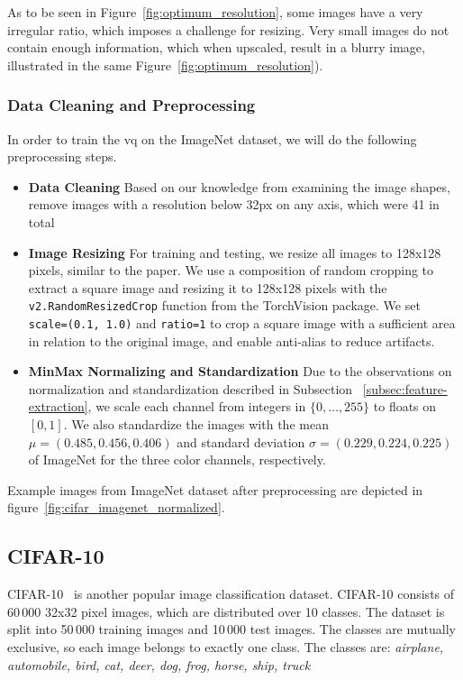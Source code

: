 As to be seen in Figure~\ref{fig:optimum_resolution}, some images have a very irregular ratio, which imposes a challenge
for resizing.
Very small images do not contain enough information, which when upscaled, result in a blurry image, illustrated in
the same Figure~\ref{fig:optimum_resolution}).

\subsubsection{Data Cleaning and Preprocessing}
In order to train the \ac{vq} on the ImageNet dataset, we will do the following preprocessing steps.

\begin{itemize}
    \item \textbf{Data Cleaning}
    Based on our knowledge from examining the image shapes, remove images with a resolution below 32px on any axis,
    which were 41 in total
    \item \textbf{Image Resizing}
    For training and testing, we resize all images to 128x128 pixels, similar to the paper.
    We use a composition of random cropping to extract a square image and resizing it to 128x128 pixels with
    the \texttt{v2.RandomResizedCrop} function from the TorchVision package.
    We set \texttt{scale=(0.1, 1.0)} and \texttt{ratio=1} to crop a square image with a sufficient area in
    relation to the original image, and enable anti-alias to reduce artifacts.
    \item \textbf{MinMax Normalizing and Standardization}
    Due to the observations on normalization and standardization described in Subsection
    ~\ref{subsec:feature-extraction}, we scale each channel from integers in $\{0,\dots,255\}$ to floats on
    $[0,1]$.
    We also standardize the images with the mean $\mu = (0.485, 0.456, 0.406)$ and standard deviation
    $\sigma = (0.229, 0.224, 0.225)$ of ImageNet for the three color channels, respectively.
\end{itemize}

Example images from ImageNet dataset after preprocessing are depicted in figure~\ref{fig:cifar_imagenet_normalized}.

\subsection{CIFAR-10}\label{subsec:cifar-10}
CIFAR-10~\cite{cifar10} is another popular image classification dataset.
CIFAR-10 consists of 60\,000 32x32 pixel images, which are distributed over 10 classes.
The dataset is split into 50\,000 training images and 10\,000 test images.
The classes are mutually exclusive, so each image belongs to exactly one class.
The classes are: \textit{airplane, automobile, bird, cat, deer, dog, frog, horse, ship, truck}

